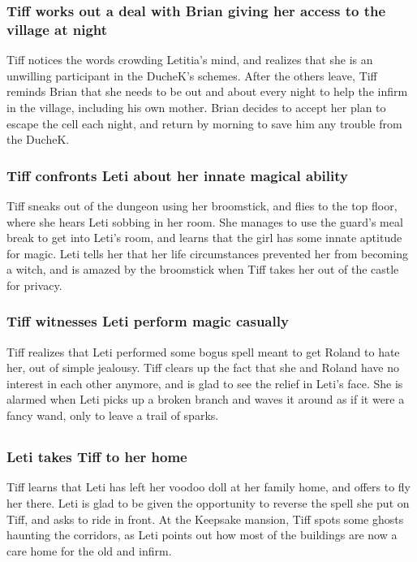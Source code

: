 \subsubsection{\Gls{Tiff} works out a deal with \Gls{Brian} giving her access to the village at
    night}
\Gls{Tiff} notices the words crowding \Gls{Letitia}'s mind, and realizes that she is an unwilling
participant in the \Gls{DucheK}'s schemes. After the others leave, \Gls{Tiff} reminds \Gls{Brian}
that she needs to be out and about every night to help the infirm in the village, including his
own mother. \Gls{Brian} decides to accept her plan to escape the cell each night, and return by
morning to save him any trouble from the \Gls{DucheK}.

\subsubsection{\Gls{Tiff} confronts \Gls{Leti} about her innate magical ability}
\Gls{Tiff} sneaks out of the dungeon using her broomstick, and flies to the top floor, where she
hears \Gls{Leti} sobbing in her room. She manages to use the guard's meal break to get into
\Gls{Leti}'s room, and learns that the girl has some innate aptitude for magic. \Gls{Leti} tells
her that her life circumstances prevented her from becoming a witch, and is amazed by the broomstick
when \Gls{Tiff} takes her out of the castle for privacy.

\subsubsection{\Gls{Tiff} witnesses \Gls{Leti} perform magic casually}
\Gls{Tiff} realizes that \Gls{Leti} performed some bogus spell meant to get \Gls{Roland} to hate
her, out of simple jealousy. \Gls{Tiff} clears up the fact that she and \Gls{Roland} have no
interest in each other anymore, and is glad to see the relief in \Gls{Leti}'s face. She is alarmed
when \Gls{Leti} picks up a broken branch and waves it around as if it were a fancy wand, only to
leave a trail of sparks.

\subsection{}
\subsubsection{\Gls{Leti} takes \Gls{Tiff} to her home}
\Gls{Tiff} learns that \Gls{Leti} has left her voodoo doll at her family home, and offers to fly
her there. \Gls{Leti} is glad to be given the opportunity to reverse the spell she put on
\Gls{Tiff}, and asks to ride in front. At the Keepsake mansion, \Gls{Tiff} spots some ghosts
haunting the corridors, as \Gls{Leti} points out how most of the buildings are now a care home for
the old and infirm.


